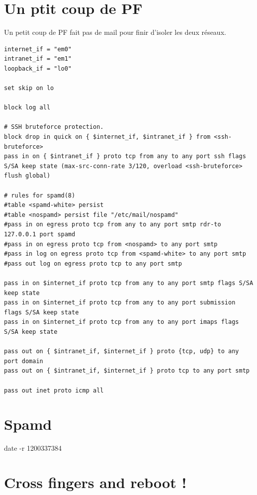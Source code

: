 \documentclass[a4paper,11pt]{article}
\begin{document}
\vspace{5mm}
\section*{Un ptit coup de PF}

Un petit coup de PF fait pas de mail pour finir d'isoler les deux réseaux. 
\vspace{5mm}
\begin{lstlisting}[caption={/etc/pf.conf},frame=bt,breaklines=true]
internet_if = "em0"
intranet_if = "em1"
loopback_if = "lo0"

set skip on lo

block log all

# SSH bruteforce protection.
block drop in quick on { $internet_if, $intranet_if } from <ssh-bruteforce> 
pass in on { $intranet_if } proto tcp from any to any port ssh flags S/SA keep state (max-src-conn-rate 3/120, overload <ssh-bruteforce> flush global) 

# rules for spamd(8)
#table <spamd-white> persist
#table <nospamd> persist file "/etc/mail/nospamd"
#pass in on egress proto tcp from any to any port smtp rdr-to 127.0.0.1 port spamd
#pass in on egress proto tcp from <nospamd> to any port smtp
#pass in log on egress proto tcp from <spamd-white> to any port smtp
#pass out log on egress proto tcp to any port smtp

pass in on $internet_if proto tcp from any to any port smtp flags S/SA keep state 
pass in on $internet_if proto tcp from any to any port submission flags S/SA keep state 
pass in on $internet_if proto tcp from any to any port imaps flags S/SA keep state 

pass out on { $intranet_if, $internet_if } proto {tcp, udp} to any port domain
pass out on { $intranet_if, $internet_if } proto tcp to any port smtp

pass out inet proto icmp all 
\end{lstlisting}

\vspace{5mm}
\section*{Spamd}

date -r 1200337384

\vspace{5mm}
\section*{Cross fingers and reboot !}
\end{document}
